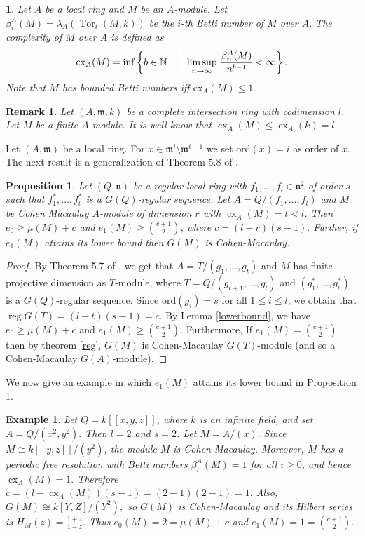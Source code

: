 \documentclass[11pt]{amsart}
\theoremstyle{plain}
\newtheorem{proposition}[theorem]{Proposition}
\newtheorem{remark}[theorem]{Remark}
\newtheorem{example}[theorem]{Example}
\newtheorem{point}[theorem]{}
\newcommand{\m}{\mathfrak{m}}
\newcommand{\n}{\mathfrak{n}}
\newcommand{\N}{\mathbb{N}}
\newcommand{\cx}{\operatorname{cx}}
\theoremstyle{plain}
\begin{document}
\begin{point}\label{complexity}
   \normalfont
   Let $A$ be a local ring and $M$ be an $A$-module. Let $\beta_i^A(M)=\lambda_A(\operatorname{Tor}_i(M,k))$ be the $i$-th Betti number of $M$ over $A.$ The complexity of $M$ over $A$ is defined as $$\textrm{cx}_A(M)=\inf \left\{b\in \N \quad \vline \quad {\limsup_{n\to \infty}} \,\, \frac{\beta_n^A(M)}{n^{b-1}}< \infty \right\}.$$
   Note that $M$ has bounded Betti numbers iff $\textrm{cx}_A(M)\leq 1.$
\end{point}

\begin{remark}
    Let $(A,\m,k)$ be a complete intersection ring with codimension $l$. Let $M$ be a finite $A$-module. It is well know that $\cx_A(M)\leq \cx_A(k)=l.$
\end{remark}


Let $(A,\m)$ be a local ring. For $x\in \m^i\setminus \m^{i+1}$ we set $\text{ord}(x)=i$ as order of $x.$ The next result is a generalization of Theorem $5.8$ of \cite{Quasipure}.

\begin{proposition}\label{ci}
    Let  $(Q,\n)$ be a regular local ring with $f_1,\ldots ,f_l\in \n^2$ of order $s$ such that $f_1^*,\ldots ,f_l^* $ is a $G(Q)$-regular sequence.  Let $A=Q/(f_1,\ldots ,f_l)$ and $M$ be Cohen Macaulay $A$-module of dimension $r$ with $\operatorname{cx}_A(M)=t< l$. Then $e_0\geq \mu(M)+c$ and $e_1(M)\geq \binom{c+1}{2}$, where $c=(l-r)(s-1).$ Further, if $e_1(M)$ attains its lower bound then $G(M)$ is Cohen-Macaulay.
\end{proposition}
\begin{proof}
    By Theorem 5.7 of \cite{Quasipure}, we get that $A=T/(g_1,\ldots ,g_t)$ and $M$ has finite projective dimension as $T$-module,  where $T=Q/(g_{t+1},\ldots ,g_l)$ and $(g_1^*,\ldots ,g_l^*)$ is a $G(Q)$-regular sequence. Since  $\text{ord}(g_i)=s$ for all $1\leq i\leq l$, we obtain that $\operatorname{reg}G(T)=(l-t)(s-1)=c$. By Lemma \ref{lowerbound}, we have $e_0\geq \mu(M)+c$ and $e_1(M)\geq \binom{c+1}{2}$. Furthermore, If $e_1(M)= \binom{c+1}{2}$ then by theorem \ref{reg}, $G(M)$ is Cohen-Macaulay $G(T)$-module (and so a Cohen-Macaulay $G(A)$-module).
\end{proof}

We now give an example in which $e_1(M)$ attains its lower bound in Proposition \ref{ci}. 

\begin{example}
\normalfont
     Let $Q=k[[x,y,z]]$, where $k$ is an infinite field, and set $A=Q/(x^2,y^2).$ Then $l=2$ and $s=2$. Let
$M=A/(x).$ Since $M\cong k[[y,z]]/(y^2)$, the module $M$ is Cohen-Macaulay. Moreover, $M$ has a periodic free resolution with Betti numbers $\beta_i^A(M)=1$ for all $i\geq 0$, and hence
$\operatorname{cx}_A(M)=1.$ Therefore
$c=(l-\operatorname{cx}_A(M))(s-1)=(2-1)(2-1)=1.$ Also,
$G(M)\cong k[Y,Z]/(Y^2),$ so $G(M)$ is Cohen-Macaulay and its Hilbert series is $\displaystyle H_M(z)=\frac{1+z}{1-z}.$ Thus
$e_0(M)=2=\mu(M)+c$ and $ e_1(M)=1=\binom{c+1}{2}.$
\end{example}
\end{document}
